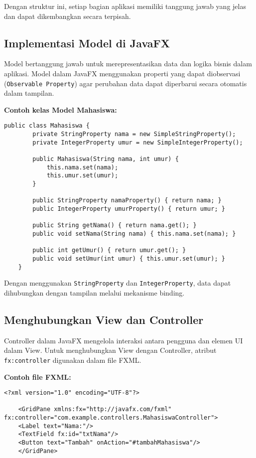 Dengan struktur ini, setiap bagian aplikasi memiliki tanggung jawab yang jelas dan dapat dikembangkan secara terpisah.

\subsection{Implementasi Model di JavaFX}

Model bertanggung jawab untuk merepresentasikan data dan logika bisnis dalam aplikasi. Model dalam JavaFX menggunakan properti yang dapat diobservasi (\texttt{Observable Property}) agar perubahan data dapat diperbarui secara otomatis dalam tampilan.

\textbf{Contoh kelas Model Mahasiswa:}
\begin{lstlisting}[style=JavaStyle, caption=Implementasi Model dalam JavaFX]
	public class Mahasiswa {
		private StringProperty nama = new SimpleStringProperty();
		private IntegerProperty umur = new SimpleIntegerProperty();
		
		public Mahasiswa(String nama, int umur) {
			this.nama.set(nama);
			this.umur.set(umur);
		}
		
		public StringProperty namaProperty() { return nama; }
		public IntegerProperty umurProperty() { return umur; }
		
		public String getNama() { return nama.get(); }
		public void setNama(String nama) { this.nama.set(nama); }
		
		public int getUmur() { return umur.get(); }
		public void setUmur(int umur) { this.umur.set(umur); }
	}
\end{lstlisting}

Dengan menggunakan \texttt{StringProperty} dan \texttt{IntegerProperty}, data dapat dihubungkan dengan tampilan melalui mekanisme binding.

\subsection{Menghubungkan View dan Controller}

Controller dalam JavaFX mengelola interaksi antara pengguna dan elemen UI dalam View. Untuk menghubungkan View dengan Controller, atribut \texttt{fx:controller} digunakan dalam file FXML.

\textbf{Contoh file FXML:}
\begin{lstlisting}[style=XmlStyle, caption=File mahasiswa.fxml dengan deklarasi Controller]
	<?xml version="1.0" encoding="UTF-8"?>
	
	<GridPane xmlns:fx="http://javafx.com/fxml" fx:controller="com.example.controllers.MahasiswaController">
	<Label text="Nama:"/>
	<TextField fx:id="txtNama"/>
	<Button text="Tambah" onAction="#tambahMahasiswa"/>
	</GridPane>
\end{lstlisting}

